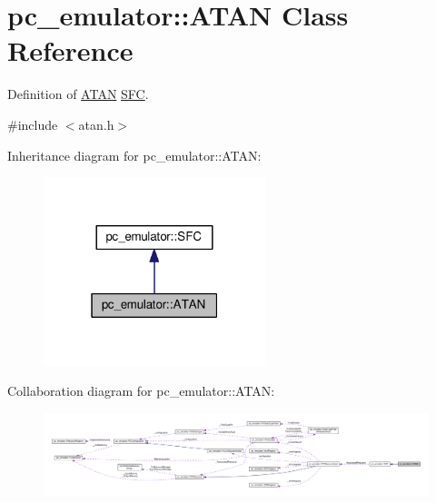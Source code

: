 \hypertarget{classpc__emulator_1_1ATAN}{}\section{pc\+\_\+emulator\+:\+:A\+T\+AN Class Reference}
\label{classpc__emulator_1_1ATAN}


Definition of \hyperlink{classpc__emulator_1_1ATAN}{A\+T\+AN} \hyperlink{classpc__emulator_1_1SFC}{S\+FC}.  




{\ttfamily \#include $<$atan.\+h$>$}



Inheritance diagram for pc\+\_\+emulator\+:\+:A\+T\+AN\+:\nopagebreak
\begin{figure}[H]
\begin{center}
\leavevmode
\includegraphics[width=183pt]{classpc__emulator_1_1ATAN__inherit__graph}
\end{center}
\end{figure}


Collaboration diagram for pc\+\_\+emulator\+:\+:A\+T\+AN\+:\nopagebreak
\begin{figure}[H]
\begin{center}
\leavevmode
\includegraphics[width=350pt]{classpc__emulator_1_1ATAN__coll__graph}
\end{center}
\end{figure}
